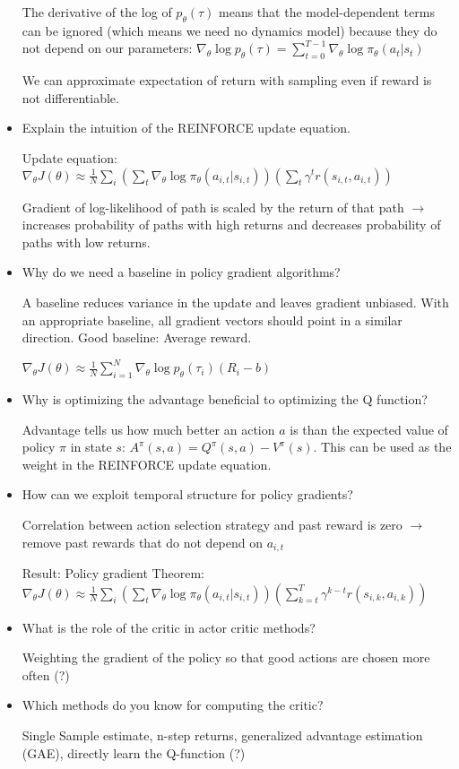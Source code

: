 \documentclass[11pt]{scrartcl}
\begin{document}
\begin{itemize}
    The derivative of the log of $p_\theta(\tau)$ means that the model-dependent terms can be ignored
    (which means we need no dynamics model)
    because they do not depend on our parameters: $\nabla_\theta \log p_\theta(\tau) = 
    \sum_{t=0}^{T-1} \nabla_\theta \log \pi_\theta(a_t|s_t)$

    We can approximate expectation of return with sampling even if reward is not differentiable.

    \item Explain the intuition of the REINFORCE update equation.
    
    Update equation: $\nabla_\theta J(\theta) \approx \frac{1}{N} \sum_i (\sum_t \nabla_\theta \log \pi_\theta(a_{i,t}|s_{i,t}))(\sum_t \gamma^t r(s_{i,t},a_{i,t}))$

    Gradient of log-likelihood of path is scaled by the return of that path $\rightarrow$ increases probability
    of paths with high returns and decreases probability of paths with low returns.

    \item Why do we need a baseline in policy gradient algorithms?
    
    A baseline reduces variance in the update and leaves gradient unbiased. With an appropriate baseline, 
    all gradient vectors should point in a similar direction. Good baseline: Average reward.

    $\nabla_\theta J(\theta) \approx \frac{1}{N} \sum_{i=1}^N \nabla_\theta \log p_\theta(\tau_i)(R_i-b)$

    \item Why is optimizing the advantage beneficial to optimizing the Q function?

    Advantage tells us how much better an action $a$ is than the expected value of policy $\pi$ in state $s$:
    $A^\pi(s,a) = Q^\pi(s,a) - V^\pi(s)$. This can be used as the weight in the REINFORCE update equation.

    \item How can we exploit temporal structure for policy gradients?
    
    Correlation between action selection strategy and past reward is zero $\rightarrow$ remove past rewards
    that do not depend on $a_{i,t}$

    Result: Policy gradient Theorem: \\ $\nabla_\theta J(\theta) \approx \frac{1}{N} \sum_i 
    (\sum_t \nabla_\theta \log \pi_\theta(a_{i,t}|s_{i,t})) (\sum_{k=t}^T \gamma^{k-t} r(s_{i,k},a_{i,k}))$

    \item What is the role of the critic in actor critic methods?
    
    Weighting the gradient of the policy so that good actions are chosen more often (?)

    \item Which methods do you know for computing the critic?
    
    Single Sample estimate, n-step returns, generalized advantage estimation (GAE), directly learn the Q-function (?)
\end{itemize}
\end{document}
